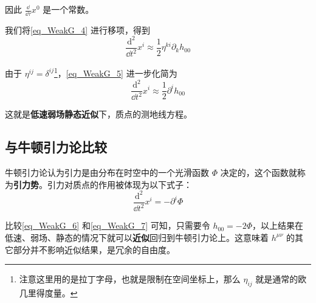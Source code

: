 因此 $\frac{\dd}{\dd\tau}x^0$ 是一个常数。

我们将\autoref{eq_WeakG_4} 进行移项，得到
\begin{equation}\label{eq_WeakG_5}
\frac{\mathrm{d}^2}{\dd t^2}x^i\approx\frac{1}{2}\eta^{ki}\partial_kh_{00}
\end{equation}

由于 $\eta^{ij}=\delta^{ij}$\footnote{注意这里用的是拉丁字母，也就是限制在空间坐标上，那么 $\eta_{ij}$ 就是通常的欧几里得度量。}，\autoref{eq_WeakG_5} 进一步化简为
\begin{equation}\label{eq_WeakG_6}
\frac{\mathrm{d}^2}{\dd t^2}x^i\approx\frac{1}{2}\partial^ih_{00}
\end{equation}

这就是\textbf{低速弱场静态近似}下，质点的测地线方程。

\subsection{与牛顿引力论比较}

牛顿引力论认为引力是由分布在时空中的一个光滑函数 $\Phi$ 决定的，这个函数就称为\textbf{引力势}。引力对质点的作用被体现为以下式子：
\begin{equation}\label{eq_WeakG_7}
\frac{\mathrm{d}^2}{\dd t^2}x^i=-\partial^i\Phi
\end{equation}

比较\autoref{eq_WeakG_6} 和\autoref{eq_WeakG_7} 可知，只需要令 $h_{00}=-2\Phi$，以上结果在低速、弱场、静态的情况下就可以\textbf{近似}回归到牛顿引力论上。这意味着 $h^{\mu\nu}$ 的其它部分并不影响近似结果，是冗余的自由度。








